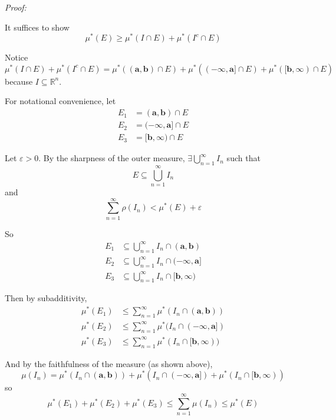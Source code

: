 \documentclass[12pt]{article}
\newcommand{\R}{\mathbb{R}}
\newcommand{\ep}{\varepsilon}
\newcommand{\sub}{\subseteq}
\newenvironment*{proof}[1][blue]{
    \begin{tcolorbox}[
        parbox=false,
        colback=#1!5!white,
        colframe=#1!75!black,
        coltext=#1,
        breakable
    ]}
    {\end{tcolorbox}}
\begin{document}
    \begin{proof}
        \emph{Proof:}

        It suffices to show 
        \[\mu^*(E) \geq \mu^*(I \cap E) + \mu^*(I^c \cap E)\]

        Notice 
        \[\mu^*(I \cap E) + \mu^*(I^c \cap E) = \mu^*((\mathbf{a}, \mathbf{b}) \cap E) + \mu^*((-\infty, \mathbf{a}] \cap E) + \mu^*([\mathbf{b}, \infty) \cap E)\] 
        because $I \sub \R^n$.

        For notational convenience, let 
        \begin{align*}
            E_1 &= (\mathbf{a}, \mathbf{b}) \cap E\\
            E_2 &= (-\infty, \mathbf{a}] \cap E\\
            E_3 &= [\mathbf{b}, \infty) \cap E
        \end{align*}

        Let $\ep > 0$. By the sharpness of the outer measure, $\exists \bigcup_{n=1}^\infty I_n$ such that 
        \[E \sub \bigcup_{n=1}^\infty I_n\] 
        and 
        \[\sum_{n=1}^\infty \rho(I_n) < \mu^*(E) + \ep\]

        So 
        \begin{align*}
            E_1 &\sub \bigcup_{n=1}^\infty I_n \cap (\mathbf{a}, \mathbf{b})\\
            E_2 &\sub \bigcup_{n=1}^\infty I_n \cap (-\infty, \mathbf{a}]\\
            E_3 &\sub \bigcup_{n=1}^\infty I_n \cap [\mathbf{b}, \infty)
        \end{align*}
        
        Then by subadditivity, 
        \begin{align*}
            \mu^*(E_1) &\leq \sum_{n=1}^\infty \mu^*(I_n \cap (\mathbf{a}, \mathbf{b}))\\
            \mu^*(E_2) &\leq \sum_{n=1}^\infty \mu^*(I_n \cap (-\infty, \mathbf{a}])\\
            \mu^*(E_3) &\leq \sum_{n=1}^\infty \mu^*(I_n \cap [\mathbf{b}, \infty)) 
        \end{align*}

        And by the faithfulness of the measure (as shown above), 
        \[\mu(I_n) = \mu^*(I_n \cap (\mathbf{a}, \mathbf{b})) + \mu^*(I_n \cap (-\infty, \mathbf{a}]) + \mu^*(I_n \cap [\mathbf{b}, \infty))\]
        so 
        \[\mu^*(E_1) + \mu^*(E_2) + \mu^*(E_3) \leq \sum_{n=1}^\infty \mu(I_n) \leq \mu^*(E)\] 
    \end{proof}
    
\end{document}
